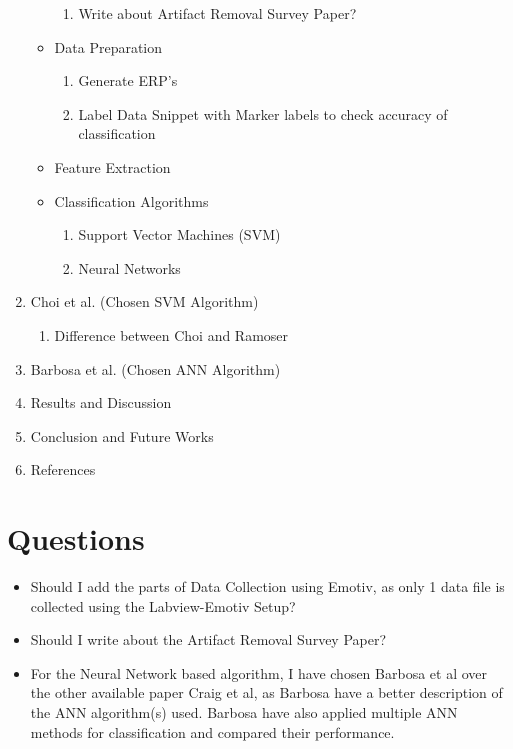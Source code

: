 \documentclass{article}
\begin{document}
\begin{enumerate}
\begin{itemize}
\begin{enumerate}
            \item Write about Artifact Removal Survey Paper?
        \end{enumerate}
        \item Data Preparation
        \begin{enumerate}
            \item Generate ERP's
            \item Label Data Snippet with Marker labels to check accuracy of classification
        \end{enumerate}
        \item Feature Extraction
        \item Classification Algorithms
        \begin{enumerate}
            \item Support Vector Machines (SVM)
            \item Neural Networks
        \end{enumerate}
    \end{itemize}
    \item Choi et al. (Chosen SVM Algorithm)
    \begin{enumerate}
        \item Difference between Choi and Ramoser
    \end{enumerate}
    \item Barbosa et al. (Chosen ANN Algorithm)
    
    \item Results and Discussion
    \item Conclusion and Future Works
    \item References
\end{enumerate}


\section{Questions}
\begin{itemize}
    \item Should I add the parts of Data Collection using Emotiv, as only 1 data file is collected using the Labview-Emotiv Setup?
    \item Should I write about the Artifact Removal Survey Paper?
    \item For the Neural Network based algorithm, I have chosen Barbosa et al over the other available paper Craig et al, as Barbosa have a better description of the ANN algorithm(s) used. Barbosa have also applied multiple ANN methods for classification and compared their performance.
\end{itemize}
\end{document}
